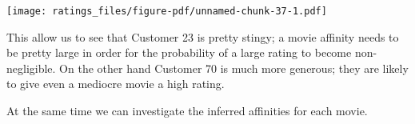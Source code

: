\documentclass[
  letterpaper,
  DIV=11,
  numbers=noendperiod]{scrartcl}
\newenvironment{Shaded}{\begin{snugshade}}{\end{snugshade}}
\newcommand{\AttributeTok}[1]{\textcolor[rgb]{0.40,0.45,0.13}{#1}}
\newcommand{\ConstantTok}[1]{\textcolor[rgb]{0.56,0.35,0.01}{#1}}
\newcommand{\ControlFlowTok}[1]{\textcolor[rgb]{0.00,0.23,0.31}{#1}}
\newcommand{\DecValTok}[1]{\textcolor[rgb]{0.68,0.00,0.00}{#1}}
\newcommand{\FloatTok}[1]{\textcolor[rgb]{0.68,0.00,0.00}{#1}}
\newcommand{\FunctionTok}[1]{\textcolor[rgb]{0.28,0.35,0.67}{#1}}
\newcommand{\NormalTok}[1]{\textcolor[rgb]{0.00,0.23,0.31}{#1}}
\newcommand{\OtherTok}[1]{\textcolor[rgb]{0.00,0.23,0.31}{#1}}
\newcommand{\SpecialCharTok}[1]{\textcolor[rgb]{0.37,0.37,0.37}{#1}}
\newcommand{\StringTok}[1]{\textcolor[rgb]{0.13,0.47,0.30}{#1}}
\begin{document}
\begin{Shaded}
\end{Shaded}

\texttt{[image: ratings\_files/figure-pdf/unnamed-chunk-37-1.pdf]}

This allow us to see that Customer 23 is pretty stingy; a movie affinity
needs to be pretty large in order for the probability of a large rating
to become non-negligible. On the other hand Customer 70 is much more
generous; they are likely to give even a mediocre movie a high rating.

At the same time we can investigate the inferred affinities for each
movie.
\end{document}
